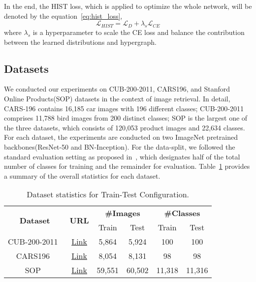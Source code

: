 In the end, the HIST loss, which is applied to optimize the whole network, will be denoted by the equation~\ref{eq:hist_loss}, 
\begin{equation}\label{eq:hist_loss}
\mathcal{L}_{HIST} = \mathcal{L}_{D} + {\lambda}_s\mathcal{L}_{CE}
\end{equation}
where ${\lambda}_s$ is a hyperparameter to scale the CE loss and balance the contribution between the learned distributions and hypergraph.

\subsection{Datasets}
We conducted our experiments on CUB‐200‐2011, CARS196, and Stanford Online Products(SOP) datasets in the context of image retrieval. In detail, CARS‐196 contains 16,185 car images with 196 different classes; CUB‐200‐2011 comprises 11,788 bird images from 200 distinct classes; SOP is the largest one of the three datasets, which consists of 120,053 product images and 22,634 classes. For each dataset, the experiments are conducted on two ImageNet pretrained backbones(ResNet‐50 and BN‐Inception). For the data-split, we followed the standard evaluation setting as proposed in~\cite{lim2022hypergraph}, which designates half of the total number of classes for training and the remainder for evaluation. Table~\ref{Dataset statistics} provides a summary of the overall statistics for each dataset.

\begin{table}[ht!]
\centering
\begin{tabular}{cccccc}
\toprule[0.8pt]
\multirow{2}{*}{\textbf{Dataset}} & \multirow{2}{*}{\textbf{URL}} & \multicolumn{2}{c}{\textbf{\#Images}} & \multicolumn{2}{c}{\textbf{\#Classes}} \\ \cline{3-6} 
                        & & Train         & Test         & Train         & Test          \\ \hline \hline
CUB-200-2011~\cite{wah2011caltech}    &\href{https://www.vision.caltech.edu/datasets/cub_200_2011/}{Link}                  & 5,864         & 5,924        & 100           & 100           \\
CARS196~\cite{krause20133d}           &\href{http://ai.stanford.edu/~jkrause/cars/car_dataset.html}{Link}     & 8,054         & 8,131        & 98            & 98            \\
SOP~\cite{oh2016deep}             &\href{https://cvgl.stanford.edu/projects/lifted_struct/}{Link} & 59,551        & 60,502       & 11,318        & 11,316        \\
\bottomrule[0.8pt]
\end{tabular}
\caption{Dataset statistics for Train-Test Configuration.}
\label{Dataset statistics}
\end{table}

